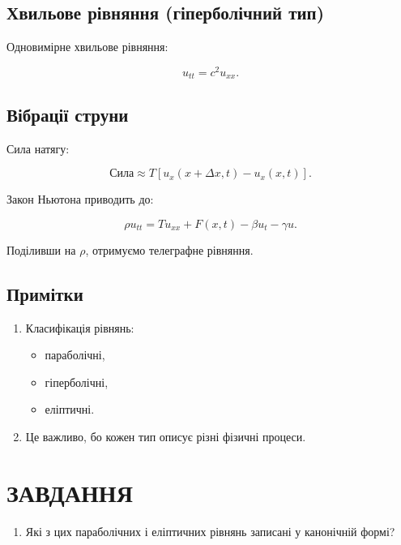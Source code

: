\documentclass[
  ukrainian,
]{article}
\providecommand{\tightlist}{%
  \setlength{\itemsep}{0pt}\setlength{\parskip}{0pt}}
\begin{document}
\subsection{Хвильове рівняння (гіперболічний
тип)}\label{ux445ux432ux438ux43bux44cux43eux432ux435-ux440ux456ux432ux43dux44fux43dux43dux44f-ux433ux456ux43fux435ux440ux431ux43eux43bux456ux447ux43dux438ux439-ux442ux438ux43f}

Одновимірне хвильове рівняння:

\[
u_{tt} = c^2 u_{xx}.
\]

\subsection{Вібрації
струни}\label{ux432ux456ux431ux440ux430ux446ux456ux457-ux441ux442ux440ux443ux43dux438}

Сила натягу:

\[
\text{Сила} \approx T \left[ u_x(x + \Delta x, t) - u_x(x, t) \right].
\]

Закон Ньютона приводить до:

\[
\rho u_{tt} = T u_{xx} + F(x,t) - \beta u_t - \gamma u.
\]

Поділивши на \(\rho\), отримуємо телеграфне рівняння.

\subsection{Примітки}\label{ux43fux440ux438ux43cux456ux442ux43aux438-2}

\begin{enumerate}
\def\labelenumi{\arabic{enumi}.}
\tightlist
\item
  Класифікація рівнянь:

  \begin{itemize}
  \tightlist
  \item
    параболічні,
  \item
    гіперболічні,
  \item
    еліптичні.
  \end{itemize}
\item
  Це важливо, бо кожен тип описує різні фізичні процеси.
\end{enumerate}

\section{ЗАВДАННЯ}\label{ux437ux430ux432ux434ux430ux43dux43dux44f-11}

\begin{enumerate}
\def\labelenumi{\arabic{enumi}.}
\tightlist
\item
  Які з цих параболічних і еліптичних рівнянь записані у канонічній
  формі?
\end{enumerate}
\end{document}

